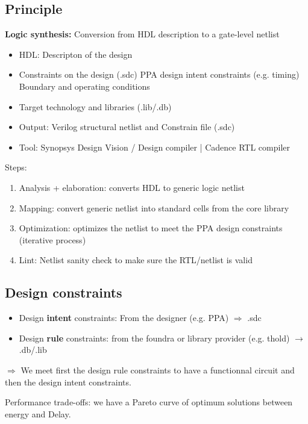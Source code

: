 
\subsection{Principle}
\textbf{Logic synthesis:} Conversion from HDL description to a gate-level netlist
\begin{itemize}
  \item HDL: Descripton of the design
  \item Constraints on the design (.sdc)
    \subitem PPA design intent constraints (e.g. timing)
    \subitem Boundary and operating conditions
  \item Target technology and libraries (.lib/.db)
  \item Output: Verilog structural netlist and Constrain file (.sdc)
    \item Tool: Synopsys Design Vision / Design compiler | Cadence RTL compiler
\end{itemize}

Steps:
\begin{enumerate}
  \item Analysis + elaboration: converts HDL to generic logic netlist
  \item Mapping: convert generic netlist into standard cells from the core library
  \item Optimization: optimizes the netlist to meet the PPA design constraints (iterative process)
  \item Lint: Netlist sanity check to make sure the RTL/netlist is valid
\end{enumerate}



\subsection{Design constraints}
\begin{itemize}
  \item Design \textbf{intent} constraints: From the designer (e.g. PPA) \(\Rightarrow\) .sdc
  \item Design \textbf{rule} constraints: from the foundra or library provider (e.g. thold) \(\rightarrow\) .db/.lib
\end{itemize}

\(\Rightarrow\) We meet first the design rule constraints to have a functionnal circuit and then the design intent constraints.


Performance trade-offs: we have a Pareto curve of optimum solutions between energy and Delay.


